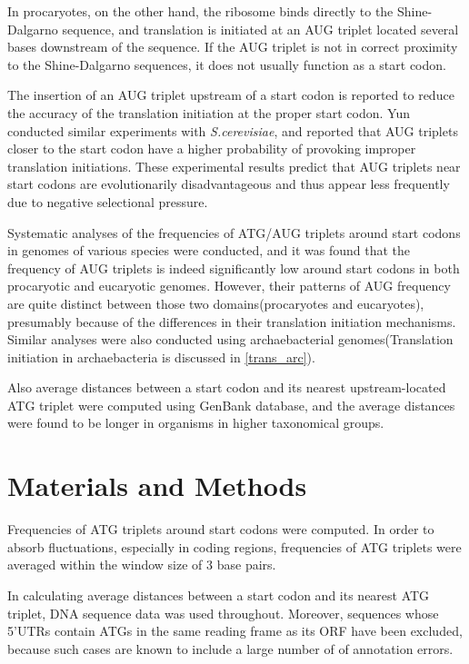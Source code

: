 In procaryotes, on the other hand, the ribosome binds directly to the
Shine-Dalgarno sequence\cite{label20,label22,label7}, and translation
is initiated at an AUG triplet located several bases downstream of the
sequence. If the AUG triplet is not in correct proximity to the
Shine-Dalgarno sequences, it does not usually function as a start
codon.

The insertion of an AUG triplet upstream of a start codon is reported
to reduce the accuracy of the translation initiation at the proper
start codon\cite{label1112,label1}. Yun\cite{label30} conducted
similar experiments with {\it S.cerevisiae}, and reported that AUG
triplets closer to the start codon have a higher probability of
provoking improper translation initiations.  These experimental
results predict that AUG triplets near start codons are evolutionarily
disadvantageous and thus appear less frequently due to negative
selectional pressure.

Systematic analyses of the frequencies of ATG/AUG triplets around
start codons in genomes of various species were conducted, and it was
found that the frequency of AUG triplets is indeed significantly low
around start codons in both procaryotic and eucaryotic genomes.
However, their patterns of AUG frequency are quite distinct between
those two domains(procaryotes and eucaryotes), presumably because of
the differences in their translation initiation mechanisms. Similar
analyses were also conducted using archaebacterial genomes(Translation
initiation in archaebacteria is discussed in \ref{trans_arc}).

Also average distances between a start codon and its nearest
upstream-located ATG triplet were computed using GenBank database, and
the average distances were found to be longer in organisms in higher
taxonomical groups.


\section{Materials and Methods}

Frequencies of ATG triplets around start codons were computed. In
order to absorb fluctuations, especially in coding regions,
frequencies of ATG triplets were averaged within the window size of 3
base pairs.

In calculating average distances between a start codon and its nearest
ATG triplet, DNA sequence data was used throughout. Moreover, sequences
whose 5'UTRs contain ATGs in the same reading frame as its ORF have
been excluded, because such cases are known to include a large number
of of annotation errors.

